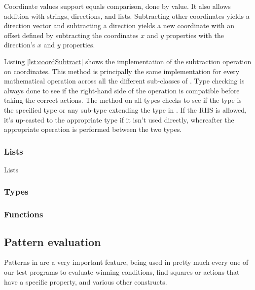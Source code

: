 Coordinate values support equals comparison, done by value. It
also allows addition with strings, directions, and lists. Subtracting
other coordinates yields a direction vector and subtracting a direction
yields a new coordinate with an offset defined by subtracting the
coordinates $x$ and $y$ properties with the direction's $x$ and $y$
properties.



Listing \ref{lst:coordSubtract} shows the implementation of the subtraction operation on coordinates. This method is principally the same implementation for every mathematical operation across all the different sub-classes of . Type checking is always done to see if the right-hand side of the operation is compatible before taking the correct actions. The method  on all  types checks to see if the type is the specified type or any sub-type extending the type in \productname{}. If the RHS is allowed, it's up-casted to the appropriate type if it isn't used directly, whereafter the appropriate operation is performed between the two types.

\subsubsection{Lists}
Lists 

\subsubsection{Types}


\subsubsection{Functions}


\subsection{Pattern evaluation}
Patterns in \productname{} are a very important feature, being used
in pretty much every one of our test programs to evaluate winning
conditions, find squares or actions that have a specific property, and
various other constructs.

